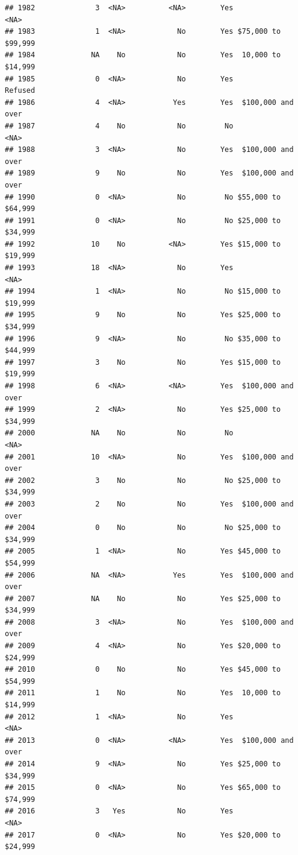 \documentclass[man]{apa6}
\begin{document}
\begin{verbatim}
## 1982              3  <NA>          <NA>        Yes               <NA>
## 1983              1  <NA>            No        Yes $75,000 to $99,999
## 1984             NA    No            No        Yes  10,000 to $14,999
## 1985              0  <NA>            No        Yes            Refused
## 1986              4  <NA>           Yes        Yes  $100,000 and over
## 1987              4    No            No         No               <NA>
## 1988              3  <NA>            No        Yes  $100,000 and over
## 1989              9    No            No        Yes  $100,000 and over
## 1990              0  <NA>            No         No $55,000 to $64,999
## 1991              0  <NA>            No         No $25,000 to $34,999
## 1992             10    No          <NA>        Yes $15,000 to $19,999
## 1993             18  <NA>            No        Yes               <NA>
## 1994              1  <NA>            No         No $15,000 to $19,999
## 1995              9    No            No        Yes $25,000 to $34,999
## 1996              9  <NA>            No         No $35,000 to $44,999
## 1997              3    No            No        Yes $15,000 to $19,999
## 1998              6  <NA>          <NA>        Yes  $100,000 and over
## 1999              2  <NA>            No        Yes $25,000 to $34,999
## 2000             NA    No            No         No               <NA>
## 2001             10  <NA>            No        Yes  $100,000 and over
## 2002              3    No            No         No $25,000 to $34,999
## 2003              2    No            No        Yes  $100,000 and over
## 2004              0    No            No         No $25,000 to $34,999
## 2005              1  <NA>            No        Yes $45,000 to $54,999
## 2006             NA  <NA>           Yes        Yes  $100,000 and over
## 2007             NA    No            No        Yes $25,000 to $34,999
## 2008              3  <NA>            No        Yes  $100,000 and over
## 2009              4  <NA>            No        Yes $20,000 to $24,999
## 2010              0    No            No        Yes $45,000 to $54,999
## 2011              1    No            No        Yes  10,000 to $14,999
## 2012              1  <NA>            No        Yes               <NA>
## 2013              0  <NA>          <NA>        Yes  $100,000 and over
## 2014              9  <NA>            No        Yes $25,000 to $34,999
## 2015              0  <NA>            No        Yes $65,000 to $74,999
## 2016              3   Yes            No        Yes               <NA>
## 2017              0  <NA>            No        Yes $20,000 to $24,999

\end{verbatim}
\end{document}
